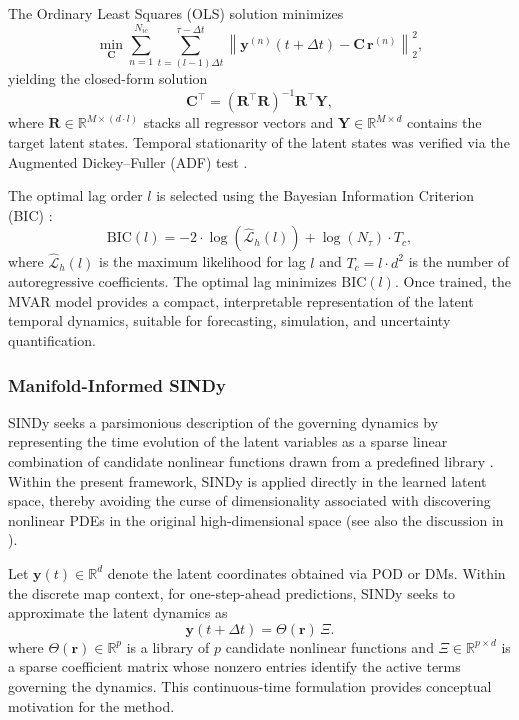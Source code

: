 \documentclass{article}
\begin{document}
The Ordinary Least Squares (OLS) solution \cite{Lutkepohl2005} minimizes
\begin{equation}
\min_{\mathbf{C}} \sum_{n = 1}^{N_{ic}} \sum_{t = (l-1)\Delta t}^{\tau - \Delta t} \left\| \mathbf{y}^{(n)}(t + \Delta t) - \mathbf{C} \, \mathbf{r}^{(n)} \right\|_2^2,
\label{eq:mar_optimization_latent_multi_y}
\end{equation}
yielding the closed-form solution
\begin{equation}
\mathbf{C}^\top = \left( \mathbf{R}^\top \mathbf{R} \right)^{-1} \mathbf{R}^\top \mathbf{Y},
\label{eq:ols_solution_y}
\end{equation}
where $\mathbf{R} \in \mathbb{R}^{M \times (d \cdot l)}$ stacks all regressor vectors and $\mathbf{Y} \in \mathbb{R}^{M \times d}$ contains the target latent states. Temporal stationarity of the latent states was verified via the Augmented Dickey–Fuller (ADF) test \cite{DickeyFuller1979}.

The optimal lag order $l$ is selected using the Bayesian Information Criterion (BIC) \cite{Lutkepohl2005}:
\begin{equation}
\text{BIC}(l) = -2 \cdot \log\!\left( \hat{\mathcal{L}}_h(l) \right) + \log(N_\tau) \cdot T_c,
\label{eq:bic_y}
\end{equation}
where $\hat{\mathcal{L}}_h(l)$ is the maximum likelihood for lag $l$ and $T_c = l \cdot d^2$ is the number of autoregressive coefficients. The optimal lag minimizes $\text{BIC}(l)$. Once trained, the MVAR model provides a compact, interpretable representation of the latent temporal dynamics, suitable for forecasting, simulation, and uncertainty quantification.

\subsubsection{Manifold-Informed SINDy}
\label{subsec:SINDy}

SINDy seeks a parsimonious description of the governing dynamics by representing the time evolution of the latent variables as a sparse linear combination of candidate nonlinear functions drawn from a predefined library \cite{brunton2016discovering,Champion_SINDy}. Within the present framework, SINDy is applied directly in the learned latent space, thereby avoiding the curse of dimensionality associated with discovering nonlinear PDEs in the original high-dimensional space (see also the discussion in \cite{Rudy2017}).

Let $\mathbf{y}(t) \in \mathbb{R}^d$ denote the latent coordinates obtained via POD or DMs. Within the discrete map context, for one-step-ahead predictions, SINDy seeks to approximate the latent dynamics as
\begin{equation}
\mathbf{y}(t+\Delta t) = \Theta(\mathbf{r}) \, \Xi.
\label{eq:sindy_model}
\end{equation}
where $\Theta(\mathbf{r}) \in \mathbb{R}^{p}$ is a library of $p$ candidate nonlinear functions and $\Xi \in \mathbb{R}^{p \times d}$ is a sparse coefficient matrix whose nonzero entries identify the active terms governing the dynamics. This continuous-time formulation provides conceptual motivation for the method.
\end{document}
